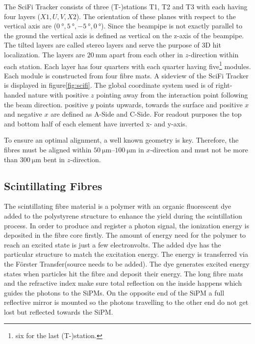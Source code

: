 The SciFi Tracker consists of three (T-)stations T1, T2 and T3 with each having four layers ($X1, U, V, X2$). The orientation of these planes with respect to the vertical axis are ($\SI{0}{\degree}, \SI{+5}{\degree}, \SI{-5}{\degree}, \SI{0}{\degree}$).
Since the beampipe is not exactly parallel to the ground the vertical axis is
defined as vertical on the z-axis of the beampipe.
The tilted layers are called stereo layers and serve the purpose of 3D hit localization.
The layers are $\SI{20}{\milli\metre}$ apart from each other in $z$-direction within each station.
Each layer has four quarters with each quarter having five\footnote{six for the last (T-)station.} modules. Each module is constructed from four fibre mats.
A sideview of the SciFi Tracker is displayed in figure\ref{fig:scifi}.
The global coordinate system used is of right-handed nature with positive $z$ pointing away from the interaction point following the beam direction. positive $y$ points upwards, towards the surface and positive $x$ and negative $x$ are defined as A-Side and C-Side\cite{scifiInfo}.
For readout purposes the top and bottom half of each element have inverted x- and y-axis.

To ensure an optimal alignment, a well known geometry is key. Therefore, the
fibres must be aligned within $\SIrange{50}{100}{\micro\metre}$ in $x$-direction and must not be more than $\SI{300}{\micro\metre}$ bent in $z$-direction.

\subsection{Scintillating Fibres}
The scintillating fibre material is a polymer with an organic fluorescent dye
added to the polystyrene structure to enhance the yield during the scintillation process.
In order to produce and register a photon signal, the ionization energy is deposited
in the fibre core firstly. The amount of energy need for the polymer to reach an
excited state is just a few electronvolts. The added dye has the particular structure
to match the excitation energy. The energy is transferred via the Förster
Transfer(source needs to be added). The dye generates excited energy states when
particles hit the fibre and deposit their energy.
The long fibre mats and the refractive index make sure total reflection on the inside
happens which guides the photons to the SiPMs. On the opposite end of the SiPM a
full reflective mirror is mounted so the photons travelling to the other end do not
get lost but reflected towards the SiPM.

